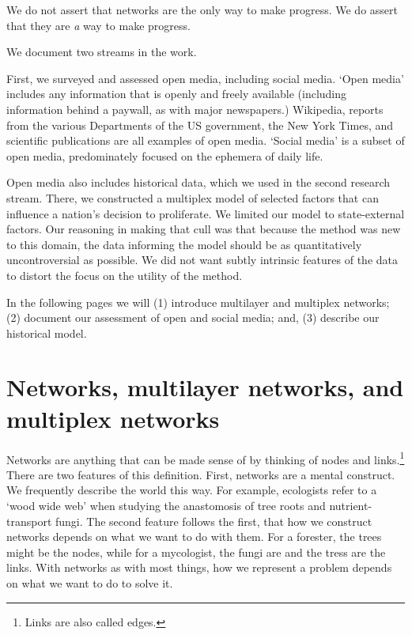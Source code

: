 \documentclass{article} %
\begin{document}
We do not assert that networks are the only way to make progress. We do assert that they are \textit{a} way to make progress. \\

\begin{center}
\end{center}

We document two streams in the work. 

First, we surveyed and assessed open media, including social media. `Open media' includes any information that is openly and freely available (including information behind a paywall, as with major newspapers.) Wikipedia, reports from the various Departments of the US government, the New York Times, and scientific publications are all examples of open media. `Social media' is a subset of open media, predominately focused on the ephemera of daily life.

Open media also includes historical data, which we used in the second research stream. There, we constructed a multiplex model of selected factors that can influence a nation's decision to proliferate. We limited our model to state-external factors. Our reasoning in making that cull was that because the method was new to this domain, the data informing the model should be as quantitatively uncontroversial as possible. We did not want subtly intrinsic features of the data to distort the focus on the utility of the method.

In the following pages we will (1) introduce multilayer and multiplex networks; (2) document our assessment of open and social media; and, (3) describe our historical model.

\newpage
\thispagestyle{empty}
\mbox{}
\newpage

\section{Networks, multilayer networks, and multiplex networks}
Networks are anything that can be made sense of by thinking of nodes and links.\footnote{Links are also called edges.} There are two features of this definition. First, networks are a mental construct. We frequently describe the world this way. For example, ecologists refer to a `wood wide web' when studying the anastomosis of tree roots and nutrient-transport fungi. The second feature follows the first, that how we construct networks depends on what we want to do with them. For a forester, the trees might be the nodes, while for a mycologist, the fungi are and the tress are the links. With networks as with most things, how we represent a problem depends on what we want to do to solve it.
\end{document}
